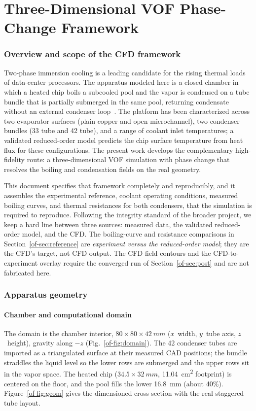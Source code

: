 \documentclass[11pt]{article}
\begin{document}
\clearpage
\part{Three-Dimensional VOF Phase-Change Framework}

\section{Overview and scope of the CFD framework}
Two-phase immersion cooling is a leading candidate for the rising thermal loads of
data-center processors. The apparatus modeled here is a closed chamber in which a
heated chip boils a subcooled pool and the vapor is condensed on a tube bundle that is
partially submerged in the same pool, returning condensate without an external
condenser loop~\cite{of-shukla2024}. The platform has been characterized across two
evaporator surfaces (plain copper and open microchannel), two condenser bundles (33
tube and 42 tube), and a range of coolant inlet temperatures; a validated reduced-order
model predicts the chip surface temperature from heat flux for these configurations.
The present work develops the complementary high-fidelity route: a three-dimensional
VOF simulation with phase change that resolves the boiling and condensation fields on
the real geometry.

This document specifies that framework completely and reproducibly, and it assembles
the experimental reference, coolant operating conditions, measured boiling curves, and
thermal resistances for both condensers, that the simulation is required to reproduce.
Following the integrity standard of the broader project, we keep a hard line between
three sources: measured data, the validated reduced-order model, and the CFD. The
boiling-curve and resistance comparisons in Section~\ref{of-sec:reference} are
\emph{experiment versus the reduced-order model}; they are the CFD's target, not CFD
output. The CFD field contours and the CFD-to-experiment overlay require the converged
run of Section~\ref{of-sec:post} and are not fabricated here.

\section{Apparatus geometry}
\label{of-sec:geom}

\subsection{Chamber and computational domain}
The domain is the chamber interior, $80 \times 80 \times \SI{42}{mm}$ ($x$~width,
$y$~tube axis, $z$~height), gravity along $-z$ (Fig.~\ref{of-fig:domain}). The 42 condenser
tubes are imported as a triangulated surface at their measured CAD positions; the bundle
straddles the liquid level so the lower rows are submerged and the upper rows sit in the
vapor space. The heated chip ($34.5\times\SI{32}{mm}$, \SI{11.04}{cm^2} footprint) is
centered on the floor, and the pool fills the lower \SI{16.8}{mm} (about 40\%).
Figure~\ref{of-fig:geom} gives the dimensioned cross-section with the real staggered tube
layout.
\end{document}
